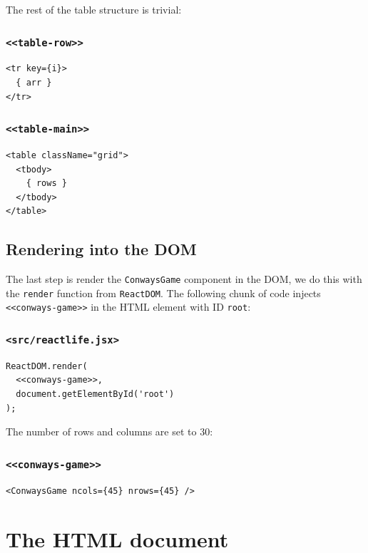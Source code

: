 \documentclass[11pt]{article}
\begin{document}
The rest of the table structure is trivial:

\subsubsection*{\texttt{<<table-row>>}}
\label{sec:org47e04f4}
\begin{verbatim}
<tr key={i}>
  { arr }
</tr>
\end{verbatim}

\subsubsection*{\texttt{<<table-main>>}}
\label{sec:orge2f7d9a}
\begin{verbatim}
<table className="grid">
  <tbody>
    { rows }
  </tbody>
</table>
\end{verbatim}

\subsection{Rendering into the DOM}
\label{sec:org090ab60}

The last step is render the \texttt{ConwaysGame} component in the DOM, we do this with the \texttt{render} function from \texttt{ReactDOM}. The following chunk of code injects \texttt{<<conways-game>>} in the HTML element with ID \texttt{root}:

\subsubsection*{\texttt{<src/reactlife.jsx>}}
\label{sec:org8b34365}
\begin{verbatim}
ReactDOM.render(
  <<conways-game>>,
  document.getElementById('root')
);
\end{verbatim}

The number of rows and columns are set to 30:

\subsubsection*{\texttt{<<conways-game>>}}
\label{sec:orgab6ad4b}
\begin{verbatim}
<ConwaysGame ncols={45} nrows={45} />
\end{verbatim}

\section{The HTML document}
\label{sec:org9faca87}
\end{document}
